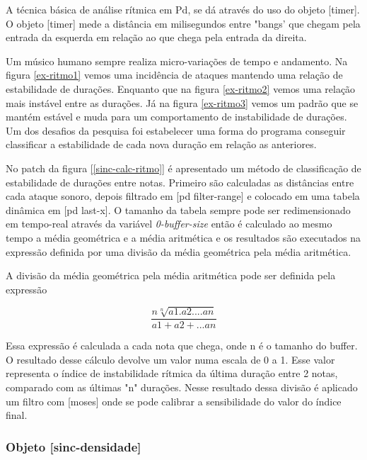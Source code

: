 \documentclass{ppgmus}
\begin{document}
A técnica básica de análise rítmica em Pd, se dá através do uso do objeto [timer].
O objeto [timer] mede a distância em milisegundos entre "bangs' que chegam pela entrada
da esquerda em relação ao que chega pela entrada da direita.%


Um músico humano sempre realiza micro-variações de tempo e andamento.
Na figura \ref{ex-ritmo1} vemos uma incidência de ataques mantendo uma relação de estabilidade
de durações. Enquanto que na figura \ref{ex-ritmo2} vemos uma relação mais instável
entre as durações. Já na figura \ref{ex-ritmo3} vemos um padrão que se mantém estável e 
muda para um comportamento de instabilidade de durações. Um dos desafios da pesquisa
foi estabelecer uma forma do programa conseguir classificar a estabilidade de cada nova duração em relação
as anteriores.

No patch da figura \ref{[sinc-calc-ritmo]} é apresentado um método de classificação de estabilidade
de durações entre notas. Primeiro são calculadas as distâncias entre cada ataque
sonoro, depois filtrado em [pd filter-range] e colocado em uma tabela dinâmica em
[pd last-x]. O tamanho da tabela sempre pode ser redimensionado em tempo-real através
da variável \textit{0-buffer-size} então é calculado ao mesmo tempo a média geométrica
e a média aritmética e os resultados são executados na expressão definida por uma
divisão da média geométrica pela média aritmética. %


A divisão da média geométrica pela média aritmética pode ser definida pela expressão

\begin{equation}
\frac{n\sqrt[n]{a1.a2....an}}{a1+a2+...an} 
\end{equation}  

Essa expressão é calculada a cada nota que chega, onde n é o tamanho do buffer.
O resultado desse cálculo devolve um valor numa escala de 0 a 1.
Esse valor representa o índice de instabilidade rítmica da última duração entre 2 notas,
comparado com as últimas "n" durações.
Nesse resultado dessa divisão é aplicado um filtro com [moses] onde se pode calibrar
a sensibilidade do valor do índice final.


\subsubsection{Objeto [sinc-densidade]}

\end{document}

